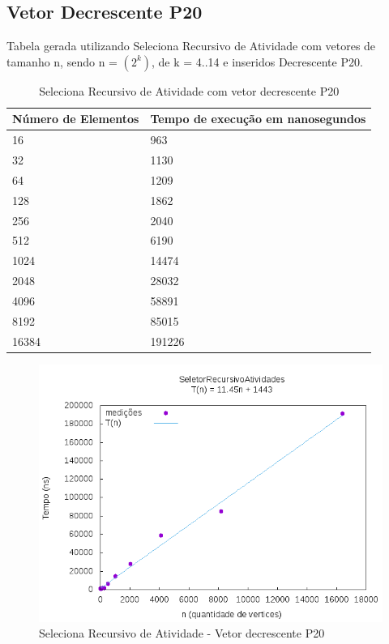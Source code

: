 \documentclass[12pt,a4paper,twoside]{report}
\begin{document}
\subsection{Vetor Decrescente P20}
Tabela gerada utilizando Seleciona Recursivo de Atividade com vetores de tamanho n, sendo n = $(2^k)$, de k = 4..14 e inseridos Decrescente P20.
\begin{table}[H]
\centering
\caption{Seleciona Recursivo de Atividade com vetor decrescente P20}
\label{my-label}
\begin{tabular}{|l|l|}
\hline
\multicolumn{1}{|c|}{\textbf{Número de Elementos}} & \multicolumn{1}{c|}{\textbf{Tempo de execução em nanosegundos}} \\ \hline
16 & 963 \\ \hline
32 & 1130 \\ \hline
64 & 1209 \\ \hline
128 & 1862 \\ \hline
256 & 2040 \\ \hline
512 & 6190 \\ \hline
1024 & 14474 \\ \hline
2048 & 28032 \\ \hline
4096 & 58891 \\ \hline
8192 & 85015 \\ \hline
16384 & 191226 \\ \hline
\end{tabular}
\end{table}

\begin{figure}[H]
    \centering
    \includegraphics[width=0.7\linewidth]{graficos/SeletorRecursivoAtividades/Decrescente P20/SelecionaAleatorizado.png}
  \caption{Seleciona Recursivo de Atividade - Vetor decrescente P20}
\end{figure}
\end{document}
